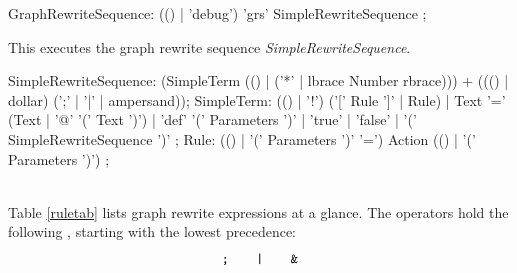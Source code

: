 \makeatletter
\begin{rail}
  GraphRewriteSequence: (() | 'debug') 'grs' SimpleRewriteSequence ;
\end{rail}
This executes the graph rewrite sequence \emph{SimpleRewriteSequence}.
\begin{rail}
  SimpleRewriteSequence: (SimpleTerm (() | ('*' | lbrace Number rbrace))) + ((() | dollar) (';' | '|' | ampersand));
  SimpleTerm: (() | '!') ('[' Rule ']' | Rule) |
    Text '=' (Text | '@' '(' Text ')') |
    'def' '(' Parameters ')' |
    'true' |
    'false' |
    '(' SimpleRewriteSequence ')' ;
  Rule: (() | '(' Parameters ')' '=') Action (() | '(' Parameters ')') ;
\end{rail}
\makeatother
\mbox{\quad}\\
Table \ref{ruletab} lists graph rewrite expressions at a glance. The operators hold the following , starting with the lowest precedence: 
\[ \text{\texttt{;}} \;\;\;\;\;\;\; \text{\texttt{|}} \;\;\;\;\;\;\;  \text{\texttt{\&}}\] 
\makeatletter
